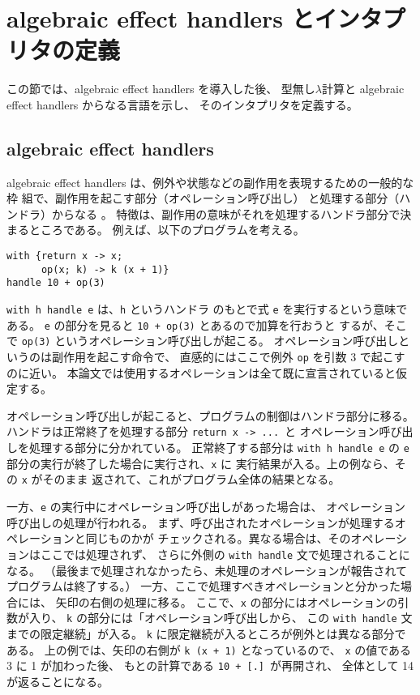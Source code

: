 \section{algebraic effect handlers とインタプリタの定義}
\label{section:definition}

この節では、algebraic effect handlers を導入した後、
型無し$\lambda$計算と algebraic effect handlers からなる言語を示し、
そのインタプリタを定義する。

\subsection{algebraic effect handlers}
\label{subsection:algebraic effect handlers}

algebraic effect handlers は、例外や状態などの副作用を表現するための一般的な枠
組で、副作用を起こす部分（オペレーション呼び出し）
と処理する部分（ハンドラ）からなる \cite{PRETNAR201519}。
特徴は、副作用の意味がそれを処理するハンドラ部分で決まるところである。
例えば、以下のプログラムを考える。
\begin{verbatim}
with {return x -> x;
      op(x; k) -> k (x + 1)}
handle 10 + op(3)
\end{verbatim}
\texttt{with h handle e} は、\texttt{h} というハンドラ
のもとで式 \texttt{e} を実行するという意味である。
\texttt{e} の部分を見ると \texttt{10 + op(3)} とあるので加算を行おうと
するが、そこで \texttt{op(3)} というオペレーション呼び出しが起こる。
オペレーション呼び出しというのは副作用を起こす命令で、
直感的にはここで例外 \texttt{op} を引数 3 で起こすのに近い。
本論文では使用するオペレーションは全て既に宣言されていると仮定する。

オペレーション呼び出しが起こると、プログラムの制御はハンドラ部分に移る。
ハンドラは正常終了を処理する部分 \texttt{return x -> ...}\ と
オペレーション呼び出しを処理する部分に分かれている。
正常終了する部分は
\texttt{with h handle e}
の \texttt{e} 部分の実行が終了した場合に実行され、\texttt{x} に
実行結果が入る。上の例なら、その \texttt{x} がそのまま
返されて、これがプログラム全体の結果となる。

一方、\texttt{e} の実行中にオペレーション呼び出しがあった場合は、
オペレーション呼び出しの処理が行われる。
まず、呼び出されたオペレーションが処理するオペレーションと同じものかが
チェックされる。異なる場合は、そのオペレーションはここでは処理されず、
さらに外側の \texttt{with handle} 文で処理されることになる。
（最後まで処理されなかったら、未処理のオペレーションが報告されて
プログラムは終了する。）
一方、ここで処理すべきオペレーションと分かった場合には、
矢印の右側の処理に移る。
ここで、\texttt{x} の部分にはオペレーションの引数が入り、
\texttt{k} の部分には「オペレーション呼び出しから、
この \texttt{with handle} 文までの限定継続」が入る。
\texttt{k} に限定継続が入るところが例外とは異なる部分である。
上の例では、矢印の右側が \texttt{k (x + 1)} となっているので、
\texttt{x} の値である 3 に 1 が加わった後、
もとの計算である \texttt{10 + [.]}\ が再開され、
全体として 14 が返ることになる。

